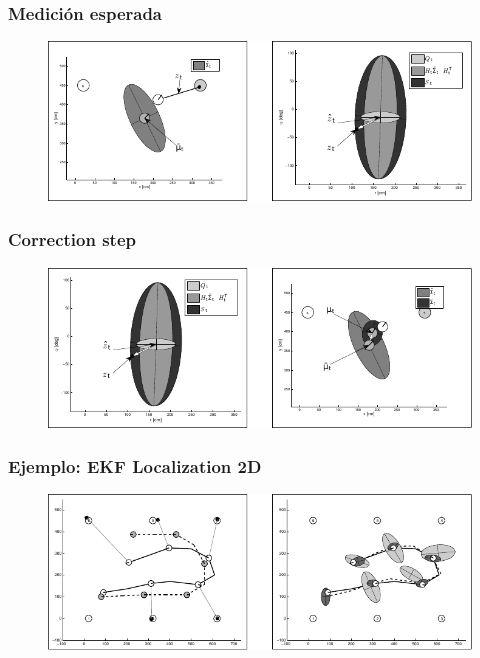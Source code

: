 \begin{frame}
	\frametitle{Medición esperada}
	
	\begin{figure}[!h]
		\includegraphics[width=\columnwidth]{./images/measurement_prediction.pdf}
	\end{figure}
	
\end{frame}

\begin{frame}
	\frametitle{Correction step}
	
	\begin{figure}[!h]
			\includegraphics[width=\columnwidth]{./images/correction_step.pdf}
	\end{figure}
	
\end{frame}

\begin{frame}
	\frametitle{Ejemplo: EKF Localization 2D}
	
	\begin{figure}[!h]
		\includegraphics[width=\columnwidth]{./images/ekf_localization_example.pdf}
	\end{figure}
	
\end{frame}


